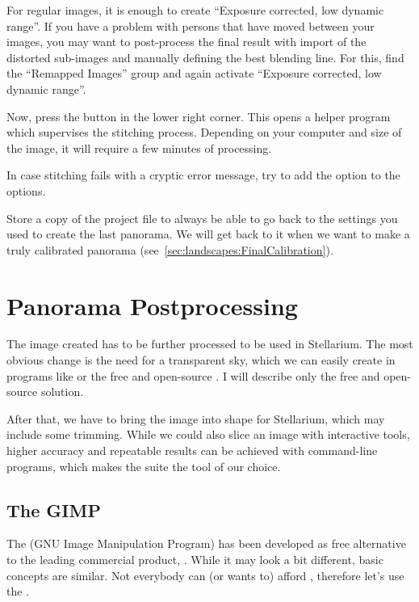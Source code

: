 For regular images, it is enough to create ``Exposure corrected, low
dynamic range''. If you have a problem with persons that have moved
between your images, you may want to post-process the final result
with import of the distorted sub-images and manually defining the best
blending line. For this, find the ``Remapped Images'' group and again
activate ``Exposure corrected, low dynamic range''.

Now, press the  button in the lower right corner. This
opens a helper program which supervises the stitching
process. Depending on your computer and size of the image, it will
require a few minutes of processing.

In case stitching fails with a cryptic error message, try to add the
option  to the  options.

Store a copy of the  project file to always be able to
go back to the settings you used to create the last panorama. We will
get back to it when we want to make a truly calibrated panorama
(see~\ref{sec:landscapes:FinalCalibration}).

\section{Panorama Postprocessing}
\label{sec:landscapes:Postprocessing}

The image created has to be further processed to be used in
Stellarium. The most obvious change is the need for a transparent sky,
which we can easily create in programs like  or the
free and open-source . I will describe only the free and
open-source solution.

After that, we have to bring the image into shape for Stellarium,
which may include some trimming. While we could also slice an image
with interactive tools, higher accuracy and repeatable results can be
achieved with command-line programs, which makes the
 suite the tool of our choice.



\subsection{The GIMP}
\label{sec:Gimp}

The  (GNU Image Manipulation Program) has been developed as free
alternative to the leading commercial product, . While
it may look a bit different, basic concepts are similar. Not everybody
can (or wants to) afford , therefore let's use the .


